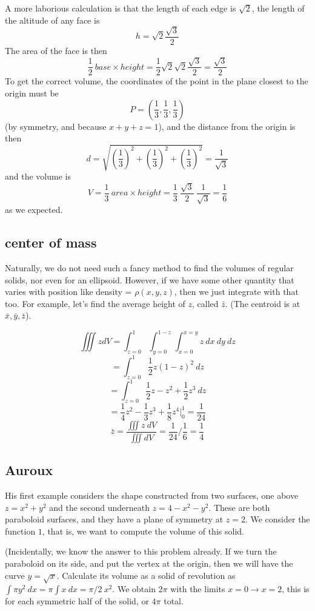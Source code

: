 \documentclass[11pt, oneside]{article}   	%
\begin{document}
A more laborious calculation is that the length of each edge is $\sqrt{2}$, the length of the altitude of any face is 
\[ h = \sqrt{2} \frac{\sqrt{3}}{2} \]
The area of the face is then
\[ \frac{1}{2} \ base \times height = \frac{1}{2} \sqrt{2} \sqrt{2} \frac{\sqrt{3}}{2} = \frac{\sqrt{3}}{2} \]
To get the correct volume, the coordinates of the point in the plane closest to the origin must be
\[ P = (\frac{1}{3},\frac{1}{3},\frac{1}{3}) \]
(by symmetry, and because $x+y+z=1$), 
and the distance from the origin is then
\[ d = \sqrt{(\frac{1}{3})^2 + (\frac{1}{3})^2 + (\frac{1}{3})^2 } = \frac{1}{\sqrt{3}} \]
and the volume is
\[ V = \frac{1}{3} \ area \times height = \frac{1}{3} \ \frac{\sqrt{3}}{2} \  \frac{1}{\sqrt{3}} = \frac{1}{6}  \] 
as we expected.
\subsection*{center of mass}
Naturally, we do not need such a fancy method to find the volumes of regular solids, nor even for an ellipsoid.  However, if we have some other quantity that varies with position like density = $\rho(x,y,z)$, then we just integrate with that too.  For example, let's find the average height of $z$, called $\bar{z}$.  (The centroid is at $\bar{x},\bar{y},\bar{z}$).
 
\[ \iiint  z dV = \int_{z=0}^1 \int_{y=0}^{1-z} \int_{x=0}^{x=y}  z \ dx \ dy \ dz \]
\[ = \int_{z=0}^1 \frac{1}{2} z(1-z)^2 \ dz \]
\[ = \int_{z=0}^1 \frac{1}{2}z - z^2 + \frac{1}{2}z^3 \ dz \]
\[ = \frac{1}{4}z^2 - \frac{1}{3}z^3 + \frac{1}{8}z^4 \bigg |_0^1 = \frac{1}{24} \]
\[ \bar{z} = \frac{ \iiint z \ dV}{\iiint dV} = \frac{1}{24} / \frac{1}{6} = \frac{1}{4} \]

\subsection*{Auroux}

His first example considers the shape constructed from two surfaces, one above $z = x^2 + y^2$ and the second underneath $z = 4 - x^2 - y^2$.  These are both paraboloid surfaces, and they have a plane of symmetry at $z = 2$.  We consider the function $1$, that is, we want to compute the volume of this solid.

(Incidentally, we know the answer to this problem already.  If we turn the paraboloid on its side, and put the vertex at the origin, then we will have the curve $y=\sqrt{x}$.  Calculate its volume as a solid of revolution as $\int \pi y^2 \ dx = \pi \int x \ dx = \pi/2 \ x^2$.  We obtain $2\pi$ with the limits $x=0 \rightarrow x=2$, this is for each symmetric half of the solid, or $4\pi$ total.
\end{document}
